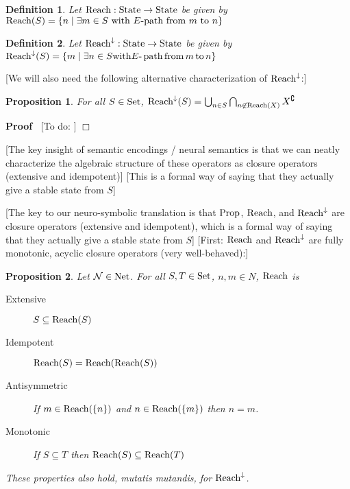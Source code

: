 \documentclass{article}
\newcommand{\tmop}[1]{\ensuremath{\operatorname{#1}}}
\newcommand{\todo}[1]{{\color{red!75!black}[To do: #1]}}
\newenvironment{proof}{\noindent\textbf{Proof\ }}{\hspace*{\fill}$\Box$\medskip}
\newtheorem{definition}{Definition}
\newtheorem{proposition}{Proposition}
\newcommand{\Net}{\mathcal{N}}
\newcommand{\Set}{\textsf{\tmop{Set}}}
\newcommand{\States}{\textsf{\tmop{State}}}
\newcommand{\Reach}{\textsf{\tmop{Reach}}}
\newcommand{\Reachedby}{\textsf{\tmop{Reach}}^{\downarrow}}
\newcommand{\Prop}{\textsf{\tmop{Prop}}}
\newcommand{\AllNets}{\textsf{\tmop{Net}}}
\begin{document}
\begin{definition}
  Let $\Reach : \States \rightarrow \States$ be given by $\Reach (S) = \left\{
  n \mid \exists m \in S \text{ with } E \text{-path from } m \text{ to } n
  \right\}$
\end{definition}

\begin{definition}
  Let $\Reachedby : \States \rightarrow \States$ be given by $\Reachedby (S) =
  \left\{ m \mid \text{} \exists n \in S \text{with} E \textrm{-} \tmop{path}
  \tmop{from} m \tmop{to} n \right\}$
\end{definition}

[We will also need the following alternative characterization of
$\Reachedby$:]

\begin{proposition}
  \label{alternative-reachedby}For all $S \in \Set$, $\Reachedby (S) =
  {\bigcup_{n \in S}}  \bigcap_{n \not{\in} \Reach (X)} X^{\complement}$
\end{proposition}

\begin{proof}
  {\todo{}}
\end{proof}

[The key insight of semantic encodings / neural semantics is that we can
neatly characterize the algebraic structure of these operators as closure
operators (extensive and idempotent)] [This is a formal way of saying that
they actually give a stable state from $S$]

[The key to our neuro-symbolic translation is that $\Prop$, $\Reach$, and
$\Reachedby$ are closure operators (extensive and idempotent), which is a
formal way of saying that they actually give a stable state from $S$] [First:
$\Reach$ and $\Reachedby$ are fully monotonic, acyclic closure operators (very
well-behaved):]

\begin{proposition}
  \label{thm:reach-props}Let $\Net \in \AllNets$. For all $S, T \in \Set$, $n,
  m \in N$, $\Reach$ is
  \begin{description}
    \item[Extensive] $S \subseteq \Reach (S)$
    
    \item[Idempotent] $\Reach (S) = \Reach (\Reach (S))$
    
    \item[Antisymmetric] If $m \in \Reach (\{ n \})$ and $n \in \Reach (\{ m
    \})$ then $n = m$.
    
    \item[Monotonic] If $S \subseteq T$ then $\Reach (S) \subseteq \Reach (T)$
  \end{description}
  These properties also hold, mutatis mutandis, for $\Reachedby$.
\end{proposition}
\end{document}
